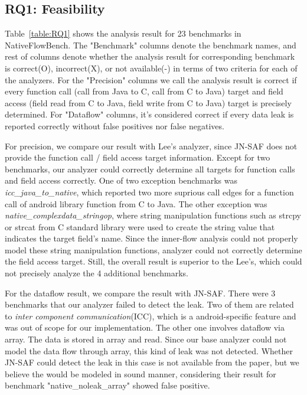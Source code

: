 \subsection{RQ1: Feasibility}

Table~\ref{table:RQ1} shows the analysis result for 23 benchmarks in
NativeFlowBench.  The "Benchmark" columns denote the benchmark names, and rest
of columns denote whether the analysis result for corresponding benchmark is
correct(O), incorrect(X), or not available(-) in terms of two criteria for each
of the analyzers. For the "Precision" columns we call the analysis result is
correct if every function call (call from Java to C, call from C to Java)
target and field access (field read from C to Java, field write from C to Java)
target is precisely determined. For "Dataflow" columns, it's considered correct
if every data leak is reported correctly without false positives nor false
negatives. 

For precision, we compare our result with Lee's analyzer, since JN-SAF does not
provide the function call / field access target information. Except for two
benchmarks, our analyzer could correctly determine all targets for function
calls and field access correctly.  One of two exception benchmarks was
\textit{icc\_java\_to\_native}, which reported two more suprious call edges for
a function call of android library function from C to Java. The other exception
was \textit{native\_complexdata\_stringop}, where string manipulation functions
such as strcpy or strcat from C standard library were used to create the string
value that indicates the target field's name. Since the inner-flow analysis
could not properly model these string manipulation functions, analyzer could
not correctly determine the field access target. Still, the overall result is
superior to the Lee's, which could not precisely analyze the 4 additional
benchmarks.

For the dataflow result, we compare the result with JN-SAF. There were 3
benchmarks that our analyzer failed to detect the leak. Two of them are related
to \textit{inter component communication}(ICC), which is a android-specific
feature and was out of scope for our implementation. The other one involves
dataflow via array. The data is stored in array and read. Since our base
analyzer could not model the data flow through array, this kind of leak was not
detected. Whether JN-SAF could detect the leak in this case is not available
from the paper, but we believe the would be modeled in sound manner,
considering their result for benchmark "native\_noleak\_array" showed false
positive. 

